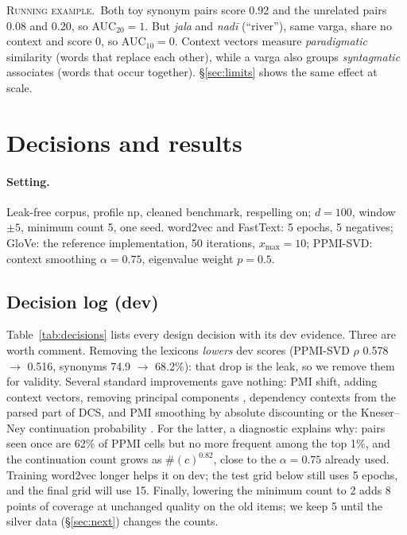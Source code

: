 \documentclass[11pt]{article}
\newcommand{\vk}[1]{\textsf{#1}}
\newcommand{\ex}{\par\smallskip\noindent\textsc{Running example.}~}
\begin{document}
\ex Both toy synonym pairs score 0.92 and the unrelated pairs 0.08 and 0.20,
so AUC$_{20}=1$. But \emph{jala} and \emph{nadī} (``river''), same varga,
share no context and score 0, so AUC$_{10}=0$. Context vectors measure
\emph{paradigmatic} similarity (words that replace each other), while a
varga also groups \emph{syntagmatic} associates (words that occur
together). \S\ref{sec:limits} shows the same effect at scale.

\section{Decisions and results}\label{sec:results}
\paragraph{Setting.} Leak-free corpus, profile \vk{np}, cleaned benchmark,
respelling on; $d=100$, window $\pm5$, minimum count 5, one seed. word2vec
and FastText: 5 epochs, 5 negatives; GloVe: the reference implementation,
50 iterations, $x_{\max}=10$; PPMI-SVD: context smoothing $\alpha=0.75$,
eigenvalue weight $p=0.5$.

\subsection{Decision log (dev)}\label{sec:decisions}
Table~\ref{tab:decisions} lists every design decision with its dev
evidence. Three are worth comment. Removing the lexicons \emph{lowers} dev
scores (PPMI-SVD $\rho$ 0.578 $\to$ 0.516, synonyms 74.9 $\to$ 68.2\%): that
drop is the leak, so we remove them for validity. Several standard
improvements gave nothing: PMI shift, adding context vectors, removing
principal components \citep{mu2018allbutthetop}, dependency contexts from the
parsed part of DCS, and PMI smoothing by absolute discounting or the
Kneser--Ney continuation probability \citep{kneser1995improved}. For the
latter, a diagnostic explains why: pairs seen once are 62\% of PPMI cells
but no more frequent among the top 1\%, and the continuation count grows as
$\#(c)^{0.82}$, close to the $\alpha=0.75$ already used. Training word2vec longer helps it on dev; the test grid below still uses
5 epochs, and the final grid will use 15. Finally, lowering the minimum
count to 2 adds 8 points of coverage at unchanged quality on
the old items; we keep 5 until the silver data (\S\ref{sec:next}) changes
the counts.
\end{document}
